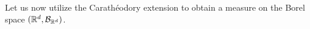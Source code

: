 Let us now utilize the Carath\'{e}odory extension to obtain a measure on the Borel space $(\mathbb R^d, \mathcal B_{\mathbb R^d})$. 

%
%
%
%

